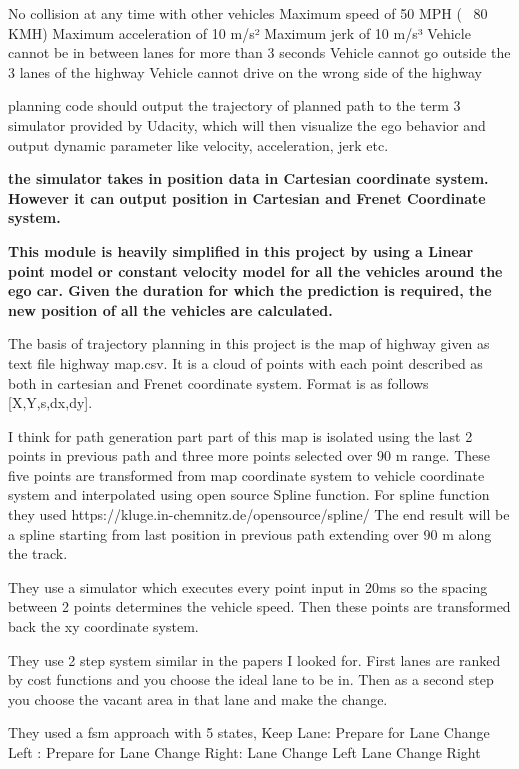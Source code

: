 \documentclass{article}
\begin{document}
    No collision at any time with other vehicles
    Maximum speed of 50 MPH (~ 80 KMH)
    Maximum acceleration of 10 m/s²
    Maximum jerk of 10 m/s³
    Vehicle cannot be in between lanes for more than 3 seconds
    Vehicle cannot go outside the 3 lanes of the highway
    Vehicle cannot drive on the wrong side of the highway
    
    planning code should output the trajectory of planned path to the term 3 simulator provided by Udacity, which will then visualize the ego behavior and output dynamic parameter like velocity, acceleration, jerk etc.
  
  \textbf{the simulator takes in position data in Cartesian coordinate system. However it can output position in Cartesian and Frenet Coordinate system. }
  
  \textbf{This module is heavily simplified in this project by using a Linear point model or constant velocity model for all the vehicles around the ego car. Given the duration for which the prediction is required, the new position of all the vehicles are calculated. }
  
  The basis of trajectory planning in this project is the map of highway given as text file highway map.csv. It is a cloud of points with each point described as both in cartesian and Frenet coordinate system. Format is as follows [X,Y,s,dx,dy].
  
  I think for path generation part  part of this map is isolated using the last 2 points in previous path and three more points selected over 90 m range. These five points are transformed from map coordinate system to vehicle coordinate system and interpolated using open source Spline function. For spline function they used https://kluge.in-chemnitz.de/opensource/spline/ The end result will be a spline starting from last position in previous path extending over 90 m along the track.
  
  They use a simulator which executes every point input in 20ms so the spacing between 2 points determines the vehicle speed. Then these points are transformed back the xy coordinate system. 
  
  They use 2 step system similar in the papers I looked for. 
  First lanes are ranked by cost functions and you choose the ideal lane to be in. 
  Then as a second step you choose the vacant area in that lane and make the change. 
  
  They used a fsm approach with 5 states,
      Keep Lane: 
    Prepare for Lane Change Left :
    Prepare for Lane Change Right: 
    Lane Change Left 
    Lane Change Right 
    
\end{document}
